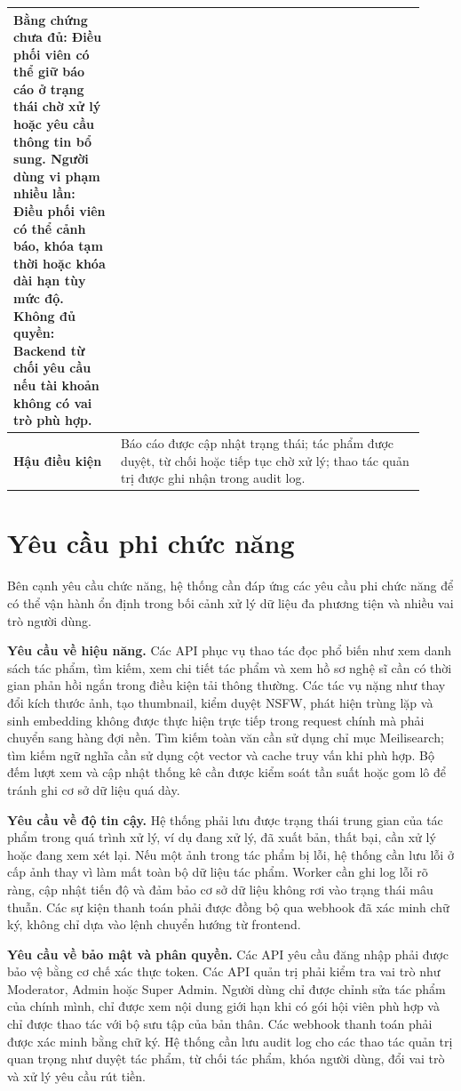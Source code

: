 \begin{table}[h!]
\begin{tabular}{|p{0.24\linewidth}|p{0.68\linewidth}|}
\textbf{Bằng chứng chưa đủ:} Điều phối viên có thể giữ báo cáo ở trạng thái chờ xử lý hoặc yêu cầu thông tin bổ sung. \newline
\textbf{Người dùng vi phạm nhiều lần:} Điều phối viên có thể cảnh báo, khóa tạm thời hoặc khóa dài hạn tùy mức độ. \newline
\textbf{Không đủ quyền:} Backend từ chối yêu cầu nếu tài khoản không có vai trò phù hợp. \\
\hline
\textbf{Hậu điều kiện} & Báo cáo được cập nhật trạng thái; tác phẩm được duyệt, từ chối hoặc tiếp tục chờ xử lý; thao tác quản trị được ghi nhận trong audit log. \\
\hline
\end{tabular}
\end{table}
\FloatBarrier

\section{Yêu cầu phi chức năng}
\label{section:2.4}

Bên cạnh yêu cầu chức năng, hệ thống cần đáp ứng các yêu cầu phi chức năng để có thể vận hành ổn định trong bối cảnh xử lý dữ liệu đa phương tiện và nhiều vai trò người dùng.

\textbf{Yêu cầu về hiệu năng.} Các API phục vụ thao tác đọc phổ biến như xem danh sách tác phẩm, tìm kiếm, xem chi tiết tác phẩm và xem hồ sơ nghệ sĩ cần có thời gian phản hồi ngắn trong điều kiện tải thông thường. Các tác vụ nặng như thay đổi kích thước ảnh, tạo thumbnail, kiểm duyệt NSFW, phát hiện trùng lặp và sinh embedding không được thực hiện trực tiếp trong request chính mà phải chuyển sang hàng đợi nền. Tìm kiếm toàn văn cần sử dụng chỉ mục Meilisearch; tìm kiếm ngữ nghĩa cần sử dụng cột vector và cache truy vấn khi phù hợp. Bộ đếm lượt xem và cập nhật thống kê cần được kiểm soát tần suất hoặc gom lô để tránh ghi cơ sở dữ liệu quá dày.

\textbf{Yêu cầu về độ tin cậy.} Hệ thống phải lưu được trạng thái trung gian của tác phẩm trong quá trình xử lý, ví dụ đang xử lý, đã xuất bản, thất bại, cần xử lý hoặc đang xem xét lại. Nếu một ảnh trong tác phẩm bị lỗi, hệ thống cần lưu lỗi ở cấp ảnh thay vì làm mất toàn bộ dữ liệu tác phẩm. Worker cần ghi log lỗi rõ ràng, cập nhật tiến độ và đảm bảo cơ sở dữ liệu không rơi vào trạng thái mâu thuẫn. Các sự kiện thanh toán phải được đồng bộ qua webhook đã xác minh chữ ký, không chỉ dựa vào lệnh chuyển hướng từ frontend.

\textbf{Yêu cầu về bảo mật và phân quyền.} Các API yêu cầu đăng nhập phải được bảo vệ bằng cơ chế xác thực token. Các API quản trị phải kiểm tra vai trò như Moderator, Admin hoặc Super Admin. Người dùng chỉ được chỉnh sửa tác phẩm của chính mình, chỉ được xem nội dung giới hạn khi có gói hội viên phù hợp và chỉ được thao tác với bộ sưu tập của bản thân. Các webhook thanh toán phải được xác minh bằng chữ ký. Hệ thống cần lưu audit log cho các thao tác quản trị quan trọng như duyệt tác phẩm, từ chối tác phẩm, khóa người dùng, đổi vai trò và xử lý yêu cầu rút tiền.

